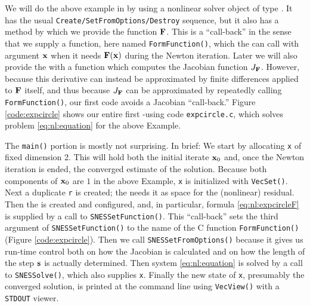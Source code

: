 We will do the above example in \PETSc by using a nonlinear solver object of type \pSNES.  It has the usual \texttt{Create/SetFromOptions/Destroy} sequence, but it also has a method by which we provide the function $\mathbf{F}$.  This is a ``call-back'' in the sense that we supply a function, here named \texttt{FormFunction()}, which the \pSNES can call with argument $\mathbf{x}$ when it needs $\mathbf{F}(\mathbf{x})$ during the Newton iteration.  Later we will also provide the \pSNES with a function which computes the Jacobian function $J_{\mathbf{F}}$.  However, because this derivative can instead be approximated by finite differences applied to $\mathbf{F}$ itself, and thus because $J_{\mathbf{F}}$ can be approximated by repeatedly calling \texttt{FormFunction()}, our first code avoids a Jacobian ``call-back.''  Figure \ref{code:expcircle} shows our entire first \pSNES-using code \texttt{expcircle.c}, which solves problem \eqref{eq:nl:equation} for the above Example.

\vfill
{}

The \texttt{main()} portion is mostly not surprising.  In brief:  We start by allocating \pVec \texttt{x} of fixed dimension 2.  This will hold both the initial iterate $\mathbf{x}_0$ and, once the Newton iteration is ended, the converged estimate of the solution.  Because both components of $\mathbf{x}_0$ are $1$ in the above Example, \pVec \texttt{x} is initialized with \texttt{VecSet()}.  Next a duplicate \pVec \texttt{r} is created; the \pSNES needs it as space for the (nonlinear) residual.  Then the \pSNES is created and configured, and, in particular, formula \eqref{eq:nl:expcircleF} is supplied by a call to \texttt{SNESSetFunction()}.  This ``call-back'' sets the third argument of \texttt{SNESSetFunction()} to the name of the C function \texttt{FormFunction()} (Figure \ref{code:expcircle}).  Then we call \texttt{SNESSetFromOptions()} because it gives us run-time control both on how the Jacobian is calculated and on how the length of the step $\mathbf{s}$ is actually determined.  Then system \eqref{eq:nl:equation} is solved by a call to \texttt{SNESSolve()}, which also supplies \pVec \texttt{x}.  Finally the new state of \texttt{x}, presumably the converged solution, is printed at the command line using \texttt{VecView()} with a \texttt{STDOUT} viewer.

